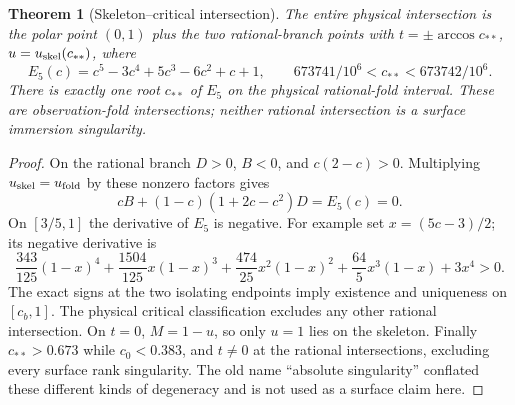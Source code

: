 \documentclass[11pt,a4paper]{article}
\newtheorem{theorem}{Theorem}[section]
\theoremstyle{definition}\newtheorem{definition}[theorem]{Definition}
\theoremstyle{remark}\newtheorem{remark}[theorem]{Remark}
\begin{document}
\begin{theorem}[Skeleton--critical intersection]\label{thm:intersection}
The entire physical intersection is the polar point $(0,1)$ plus the two
rational-branch points with $t=\pm\arccos c_{**}$,
$u=u_{\rm skel}(c_{**})$, where
\[
 E_5(c)=c^5-3c^4+5c^3-6c^2+c+1,\qquad
 673741/10^6<c_{**}<673742/10^6.
\]
There is exactly one root $c_{**}$ of $E_5$ on the physical rational-fold
interval. These are observation-fold intersections; neither rational
intersection is a surface immersion singularity.
\end{theorem}
\begin{proof}
On the rational branch $D>0$, $B<0$, and $c(2-c)>0$.
Multiplying $u_{\rm skel}=u_{\rm fold}$ by these nonzero factors gives
\[
 cB+(1-c)(1+2c-c^2)D=E_5(c)=0.
\]
On $[3/5,1]$ the derivative of $E_5$ is negative. For example set
$x=(5c-3)/2$; its negative derivative is
\[
 \frac{343}{125}(1-x)^4+\frac{1504}{125}x(1-x)^3+
 \frac{474}{25}x^2(1-x)^2+\frac{64}{5}x^3(1-x)+3x^4>0.
\]
The exact signs at the two isolating endpoints imply existence and
uniqueness on $[c_b,1]$. The physical critical classification excludes
any other rational intersection. On $t=0$, $M=1-u$, so only $u=1$
lies on the skeleton. Finally $c_{**}>0.673$ while $c_0<0.383$, and
$t\ne0$ at the rational intersections, excluding every surface rank
singularity. The old name ``absolute singularity'' conflated these
different kinds of degeneracy and is not used as a surface claim here.
\end{proof}
\end{document}
